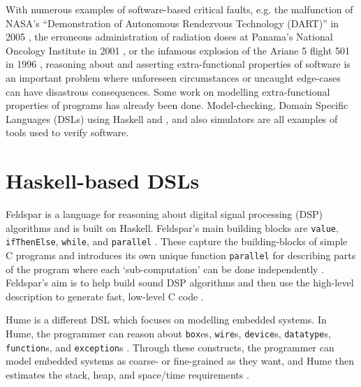 With numerous examples of software-based critical faults, e.g. the malfunction of NASA's ``Demonstration of Autonomous Rendezvous Technology (DART)'' in 2005 \cite{nasa2006dart}, the erroneous administration of radiation doses at Panama's National Oncology Institute in 2001 \cite{borras2006overexposure}, or the infamous explosion of the Ariane 5 flight 501 in 1996 \cite{board1996ariane}, reasoning about and asserting extra-functional properties of software is an important problem where unforeseen circumstances or uncaught edge-cases can have disastrous consequences. Some work on modelling extra-functional properties of programs has already been done. Model-checking,  Domain Specific Languages (DSLs) using Haskell and \Idris, and also simulators are all examples of tools used to verify software.


\section{Haskell-based DSLs}
	Feldspar \cite{5558637} is a language for reasoning about digital signal processing (DSP) algorithms and is built on Haskell. Feldspar's main building blocks are \texttt{value}, \texttt{ifThenElse}, \texttt{while}, and \texttt{parallel} \cite{5558637}. These capture the building-blocks of simple C programs and introduces its own unique function \texttt{parallel} for describing parts of the program where each `sub-computation' can be done independently \cite{5558637}. Feldspar's aim is to help build sound DSP algorithms and then use the high-level description to generate fast, low-level C code \cite{5558637}.
    \\\par
	
	Hume \cite{10.1007/978-3-540-39815-8_3} is a different DSL which focuses on modelling embedded systems. In Hume, the programmer can reason about \texttt{box}es, \texttt{wire}s, \texttt{device}s, \texttt{datatype}s, \texttt{function}s, and \texttt{exception}s \cite{10.1007/978-3-540-39815-8_3}. Through these constructs, the programmer can model embedded systems as coarse- or fine-grained as they want, and Hume then estimates the stack, heap, and space/time requirements \cite{10.1007/978-3-540-39815-8_3}.


